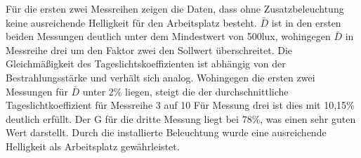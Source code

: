 Für die ersten zwei Messreihen zeigen die Daten, dass ohne Zusatzbeleuchtung keine ausreichende Helligkeit für den Arbeitsplatz besteht. $\bar D$ ist in den ersten beiden Messungen deutlich unter dem Mindestwert von 500lux, wohingegen $\bar D$ in Messreihe drei um den Faktor zwei den Sollwert überschreitet. 
Die Gleichmäßigkeit des Tageslichtskoeffizienten ist abhängig von der Bestrahlungsstärke und verhält sich analog. Wohingegen die ersten zwei Messungen für $\bar D$ unter 2\% liegen, steigt die der durchschnittliche Tageslichtkoeffizient für Messreihe 3 auf 10%
Für Messung drei ist dies mit 10,15\% deutlich erfüllt.
Der G für die dritte Messung liegt bei 78\%, was einen sehr guten Wert darstellt.
Durch die installierte Beleuchtung wurde eine ausreichende Helligkeit als Arbeitsplatz gewährleistet.

